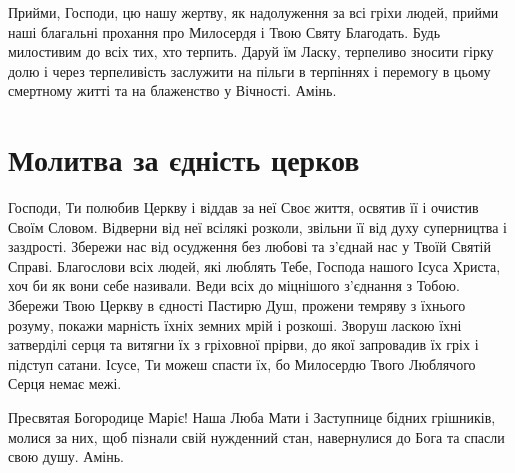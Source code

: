 \documentclass[chapters.tex]{subfiles}
\begin{document}
Прийми, Господи, цю нашу жертву, як надолуження за всі гріхи людей, прийми наші благальні прохання про Милосердя і Твою Святу Благодать. Будь милостивим до всіх тих, хто терпить. Даруй їм Ласку, терпеливо зносити гірку долю і через терпеливість заслужити на пільги в терпіннях і перемогу в цьому смертному житті та на блаженство у Вічності. Амінь.

\section{Молитва за єдність церков}
Господи, Ти полюбив Церкву і віддав за неї Своє життя, освятив її і очистив Своїм Словом. Відверни від неї всілякі розколи, звільни її від духу суперництва і заздрості. Збережи нас від осудження без любові та з’єднай нас у Твоїй Святій Справі. Благослови всіх людей, які люблять Тебе, Господа нашого Ісуса Христа, хоч би як вони себе називали. Веди всіх до міцнішого з’єднання з Тобою. Збережи Твою Церкву в єдності Пастирю Душ, прожени темряву з їхнього розуму, покажи марність їхніх земних мрій і розкоші. Зворуш ласкою їхні затверділі серця та витягни їх з гріховної прірви, до якої запровадив їх гріх і підступ сатани. Ісусе, Ти можеш спасти їх, бо Милосердю Твого Люблячого Серця немає межі.

Пресвятая Богородице Маріє! Наша Люба Мати і Заступнице бідних грішників, молися за них, щоб пізнали свій нужденний стан, навернулися до Бога та спасли свою душу. Амінь.
\end{document}
